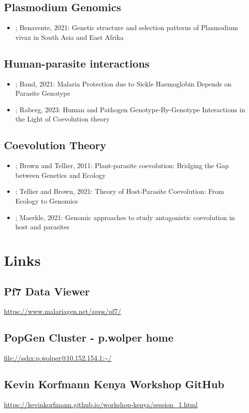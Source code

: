 \documentclass[11pt]{article}
\begin{document}
\subsection{Plasmodium Genomics}
\label{sec:orgf3857a6}
\begin{itemize}
\item \cite{benavente-2021-distin-genet}; Benavente, 2021: Genetic structure and selection patterns of Plasmodium vivax in South Asia and East Afrika
\end{itemize}

\subsection{Human-parasite interactions}
\label{sec:org0de348b}
\begin{itemize}
\item \cite{band-2021-malar-protec}; Band, 2021: Malaria Protection due to Sickle Haemoglobin Depends on Parasite Genotype
\item \cite{raberg-2023-human-pathog}; Raberg, 2023: Human and Pathogen Genotype-By-Genotype Interactions in the Light of Coevolution theory
\end{itemize}

\subsection{Coevolution Theory}
\label{sec:org7037a4c}
\begin{itemize}
\item \cite{brown-2011-plant-paras-coevol}; Brown and Tellier, 2011: Plant-parasite coevolution: Bridging the Gap between Genetics and Ecology
\item \cite{tellier-2021-theor-host}; Tellier and Brown, 2021: Theory of Host-Parasite Coevolution: From Ecology to Genomics
\item \cite{maerkle-2021-novel-genom}; Maerkle, 2021: Genomic approaches to study antagonistic coevolution in host and parasites
\end{itemize}

\section{Links}
\label{sec:org6da40e4}
\subsection{Pf7 Data Viewer}
\label{sec:orge2ae74a}
\url{https://www.malariagen.net/apps/pf7/}

\subsection{PopGen Cluster - p.wolper home}
\label{sec:orgfb8c444}
\url{file://sshx:p.wolper@10.152.154.1:\~/}

\subsection{Kevin Korfmann Kenya Workshop GitHub}
\label{sec:org7c0bec0}
\url{https://kevinkorfmann.github.io/workshop-kenya/session\_1.html}
\end{document}
